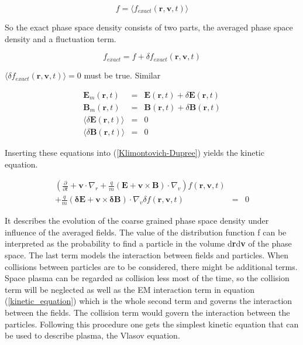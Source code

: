 \documentclass[a4paper,11pt]{thesis}
\begin{document}
\begin{equation}\label{f_av}
f=\langle f_{exact}(\mathbf{r,v},t) \rangle
\end{equation}

So the exact phase space density consists of two parts, the averaged phase space density and a fluctuation term.

\begin{equation}\label{f_exact}
f_{exact}=f+ \delta f_{exact}(\mathbf{r,v},t)
\end{equation}

$\langle \delta f_{exact}(\mathbf{r,v},t) \rangle =0$ must be true.
Similar

\begin{eqnarray}
\mathbf{E}_m(\mathbf{r},t) &=& \mathbf{E}(\mathbf{r},t)+\delta \mathbf{E}(\mathbf{r},t) \\
\mathbf{B}_m (\mathbf{r},t)&=& \mathbf{B}(\mathbf{r},t)+\delta \mathbf{B}(\mathbf{r},t) \\
\langle \delta \mathbf{E}(\mathbf{r},t) \rangle &=& 0 \\
\langle \delta \mathbf{B}(\mathbf{r},t) \rangle &=& 0
\end{eqnarray}

Inserting these equations into (\ref{Klimontovich-Dupree}) yields the kinetic equation.

\begin{eqnarray}\label{kinetic_equation}
\left( \frac{\partial}{\partial t} + \mathbf{v}\cdot
\nabla_r+\frac{q}{m}(\mathbf{E}+\mathbf{v}\times
\mathbf{B})\cdot\nabla_v \right) f(\mathbf{r,v},t)&&\\
+\frac{q}{m}(\mathbf{\delta E}+\mathbf{v}\times \mathbf{\delta
B})\cdot\nabla_v \delta f(\mathbf{r,v},t)&=&0\nonumber
\end{eqnarray}

It describes the evolution of the coarse grained phase space density under influence of the
 averaged fields. The value of the distribution function f can be interpreted as the probability
  to find a particle in the volume d\textbf{r}d\textbf{v} of the phase space. The last term
  models the interaction between fields and particles. When collisions between particles are
  to be considered, there might be additional terms. Space plasma can be regarded as collision
  less most of the time, so the collision term will be neglected as well as the EM interaction term
  in equation (\ref{kinetic_equation}) which is the whole second term and governs the interaction between the fields. The collision term would govern the interaction between the particles. Following this procedure one gets the simplest kinetic equation that can be used to describe plasma, the Vlasov equation.
\end{document}
